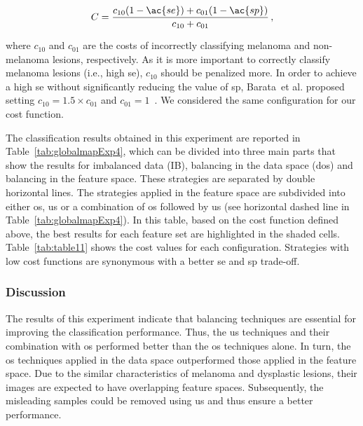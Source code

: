 \begin{equation}\label{eq:cost}
C = \frac{c_{10}(1-\ac{se})+c_{01}(1-\ac{sp})}{c_{10}+c_{01}} \,,
\end{equation}

\noindent where $c_{10}$ and $c_{01}$ are the costs of incorrectly classifying melanoma and non-melanoma lesions, respectively.
As it is more important to correctly classify melanoma lesions (i.e., high \ac{se}), $c_{10}$ should be penalized more.
In order to achieve a high \ac{se} without significantly reducing the value of \ac{sp}, Barata~et al. proposed setting $c_{10} = 1.5 \times c_{01}$ and $c_{01} = 1$~\cite{barata2013towards}.  
We considered the same configuration for our cost function. 

The classification results obtained in this experiment are reported in Table~\ref{tab:globalmapExp4}, which can be divided into three main parts that show the results for imbalanced data (IB), balancing in the data space (\ac{dos}) and balancing in the feature space.
These strategies are separated by double horizontal lines.
The strategies applied in the feature space are subdivided into either \ac{os}, \ac{us} or a combination of \ac{os} followed by \ac{us} (see horizontal dashed line in Table~\ref{tab:globalmapExp4}).
In this table, based on the cost function defined above, the best results for each feature set are highlighted in the shaded cells.
Table~\ref{tab:table11} shows the cost values for each configuration. 
Strategies with low cost functions are synonymous with a better \ac{se} and \ac{sp} trade-off.
\afterpage{


}
\subsubsection{Discussion}
The results of this experiment indicate that balancing techniques are essential for improving the classification performance. 
Thus, the \ac{us} techniques and their combination with \ac{os} performed better than the \ac{os} techniques alone. 
In turn, the \ac{os} techniques applied in the data space outperformed those applied in the feature space.
Due to the similar characteristics of melanoma and dysplastic lesions, their images are expected to have overlapping feature spaces. 
Subsequently, the misleading samples could be removed using \ac{us} and thus ensure a better performance.
%

